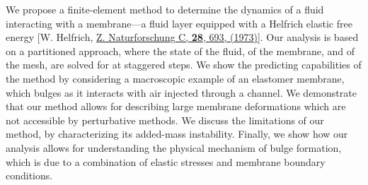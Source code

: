 We propose a finite-element method to determine the dynamics of a  fluid interacting with a membrane---a fluid layer equipped with a Helfrich elastic free energy  [W. Helfrich, \href{https://www.degruyterbrill.com/document/doi/10.1515/znc-1973-11-1209/html}{Z.  Naturforschung C, \textbf{28}, 693, (1973)}].
Our analysis is based on a partitioned approach, where the state of the fluid, of the membrane, and of the mesh, are solved for at staggered steps. We show the predicting capabilities of the method by considering a macroscopic example of an elastomer membrane, which bulges as it interacts with air injected through a channel. We demonstrate that our method allows for describing large membrane deformations which are not accessible by perturbative methods.  We discuss the limitations of our method, by characterizing its added-mass instability. Finally, we show how our analysis allows for understanding the physical mechanism of bulge formation, which is due to a combination of elastic stresses and membrane boundary conditions.